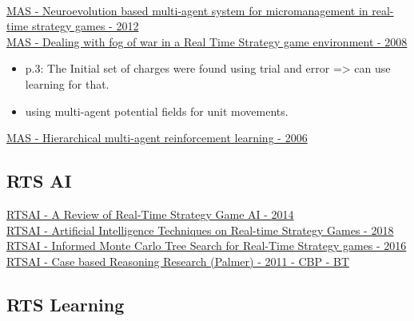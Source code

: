 \\
\href{https://dl.acm.org/doi/abs/10.1145/2371316.2371324}{MAS - Neuroevolution based multi-agent system for micromanagement in real-time strategy games - 2012}
\\
\href{https://ieeexplore.ieee.org/document/5035621}{MAS - Dealing with fog of war in a Real Time Strategy game environment - 2008}
\begin{itemize}[noitemsep,nolistsep]
	\item p.3: The Initial set of charges were found using trial and error => can use learning for that.
	\item using multi-agent potential fields for unit movements.
\end{itemize}

\href{https://link.springer.com/article/10.1007/s10458-006-7035-4}{MAS - Hierarchical multi-agent reinforcement learning - 2006}


\subsection{RTS AI}

\href{https://ojs.aaai.org/index.php/aimagazine/article/view/2478}{RTSAI - A Review of Real-Time Strategy Game AI - 2014}
\\
\href{https://dl.acm.org/doi/10.1145/3297156.3297188}{RTSAI - Artificial Intelligence Techniques on Real-time Strategy Games - 2018}
\\
\href{https://ieeexplore.ieee.org/abstract/document/7860394}{RTSAI - Informed Monte Carlo Tree Search for Real-Time Strategy games - 2016}
\\
\href{https://link.springer.com/chapter/10.1007/978-3-642-23291-6_15}{RTSAI - Case based Reasoning Research (Palmer) - 2011 - CBP - BT}

\subsection{RTS Learning}

